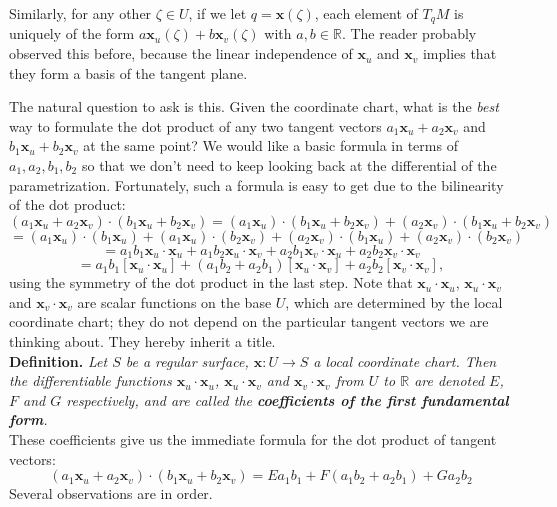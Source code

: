 \documentclass[leqno]{book}
\begin{document}
Similarly, for any other $\zeta\in U$, if we let $q=\mathbf x(\zeta)$, each element of $T_qM$ is uniquely of the form $a\mathbf x_u(\zeta)+b\mathbf x_v(\zeta)$ with $a,b\in\mathbb R$.  The reader probably observed this before, because the linear independence of $\mathbf x_u$ and $\mathbf x_v$ implies that they form a basis of the tangent plane.

The natural question to ask is this.  Given the coordinate chart, what is the \emph{best} way to formulate the dot product of any two tangent vectors $a_1\mathbf x_u+a_2\mathbf x_v$ and $b_1\mathbf x_u+b_2\mathbf x_v$ at the same point?  We would like a basic formula in terms of $a_1,a_2,b_1,b_2$ so that we don't need to keep looking back at the differential of the parametrization.  Fortunately, such a formula is easy to get due to the bilinearity of the dot product:
$$(a_1\mathbf x_u+a_2\mathbf x_v)\cdot(b_1\mathbf x_u+b_2\mathbf x_v)=(a_1\mathbf x_u)\cdot(b_1\mathbf x_u+b_2\mathbf x_v)+(a_2\mathbf x_v)\cdot(b_1\mathbf x_u+b_2\mathbf x_v)$$
$$=(a_1\mathbf x_u)\cdot(b_1\mathbf x_u)+(a_1\mathbf x_u)\cdot(b_2\mathbf x_v)+(a_2\mathbf x_v)\cdot(b_1\mathbf x_u)+(a_2\mathbf x_v)\cdot(b_2\mathbf x_v)$$
$$=a_1b_1\mathbf x_u\cdot\mathbf x_u+a_1b_2\mathbf x_u\cdot\mathbf x_v+a_2b_1\mathbf x_v\cdot\mathbf x_u+a_2b_2\mathbf x_v\cdot\mathbf x_v$$
$$=a_1b_1[\mathbf x_u\cdot\mathbf x_u]+(a_1b_2+a_2b_1)[\mathbf x_u\cdot\mathbf x_v]+a_2b_2[\mathbf x_v\cdot\mathbf x_v],$$
using the symmetry of the dot product in the last step.  Note that $\mathbf x_u\cdot\mathbf x_u$, $\mathbf x_u\cdot\mathbf x_v$ and $\mathbf x_v\cdot\mathbf x_v$ are scalar functions on the base $U$, which are determined by the local coordinate chart; they do not depend on the particular tangent vectors we are thinking about.  They hereby inherit a title.\\

\noindent\textbf{Definition.} \emph{Let $S$ be a regular surface, $\mathbf x:U\to S$ a local coordinate chart.  Then the differentiable functions $\mathbf x_u\cdot\mathbf x_u$, $\mathbf x_u\cdot\mathbf x_v$ and $\mathbf x_v\cdot\mathbf x_v$ from $U$ to $\mathbb R$ are denoted $E$, $F$ and $G$ respectively, and are called the \textbf{coefficients of the first fundamental form}.}\\

\noindent These coefficients give us the immediate formula for the dot product of tangent vectors:
\begin{equation}\tag{*}(a_1\mathbf x_u+a_2\mathbf x_v)\cdot(b_1\mathbf x_u+b_2\mathbf x_v)=Ea_1b_1+F(a_1b_2+a_2b_1)+Ga_2b_2\end{equation}
Several observations are in order.
\end{document}
